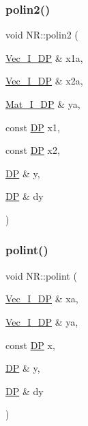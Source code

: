\subsubsection{\texorpdfstring{polin2()}{polin2()}}
{\footnotesize\ttfamily void N\+R\+::polin2 (\begin{DoxyParamCaption}\item[{\mbox{\hyperlink{namespaceNR_a9f943da53862537c552e2a770cb170ae}{Vec\+\_\+\+I\+\_\+\+DP}} \&}]{x1a,  }\item[{\mbox{\hyperlink{namespaceNR_a9f943da53862537c552e2a770cb170ae}{Vec\+\_\+\+I\+\_\+\+DP}} \&}]{x2a,  }\item[{\mbox{\hyperlink{namespaceNR_a2b8abfda8fffad6ba0a1b5a4c0773dbf}{Mat\+\_\+\+I\+\_\+\+DP}} \&}]{ya,  }\item[{const \mbox{\hyperlink{namespaceNR_af6ff762dd605ff477b8e52387253a02a}{DP}}}]{x1,  }\item[{const \mbox{\hyperlink{namespaceNR_af6ff762dd605ff477b8e52387253a02a}{DP}}}]{x2,  }\item[{\mbox{\hyperlink{namespaceNR_af6ff762dd605ff477b8e52387253a02a}{DP}} \&}]{y,  }\item[{\mbox{\hyperlink{namespaceNR_af6ff762dd605ff477b8e52387253a02a}{DP}} \&}]{dy }\end{DoxyParamCaption})}

\mbox{\label{namespaceNR_ab748a48a0cfdc9215829774ddf25ea90}} 
\subsubsection{\texorpdfstring{polint()}{polint()}}
{\footnotesize\ttfamily void N\+R\+::polint (\begin{DoxyParamCaption}\item[{\mbox{\hyperlink{namespaceNR_a9f943da53862537c552e2a770cb170ae}{Vec\+\_\+\+I\+\_\+\+DP}} \&}]{xa,  }\item[{\mbox{\hyperlink{namespaceNR_a9f943da53862537c552e2a770cb170ae}{Vec\+\_\+\+I\+\_\+\+DP}} \&}]{ya,  }\item[{const \mbox{\hyperlink{namespaceNR_af6ff762dd605ff477b8e52387253a02a}{DP}}}]{x,  }\item[{\mbox{\hyperlink{namespaceNR_af6ff762dd605ff477b8e52387253a02a}{DP}} \&}]{y,  }\item[{\mbox{\hyperlink{namespaceNR_af6ff762dd605ff477b8e52387253a02a}{DP}} \&}]{dy }\end{DoxyParamCaption})}

